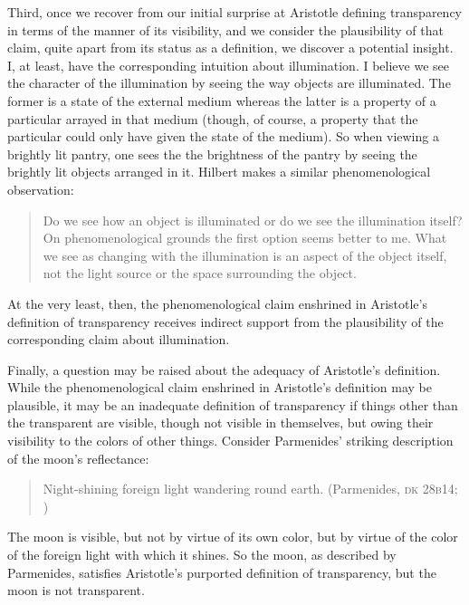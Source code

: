 Third, once we recover from our initial surprise at Aristotle defining transparency in terms of the manner of its visibility, and we consider the plausibility of that claim, quite apart from its status as a definition, we discover a potential insight. I, at least, have the corresponding intuition about illumination. I believe we see the character of the illumination by seeing the way objects are illuminated. The former is a state of the external medium whereas the latter is a property of a particular arrayed in that medium (though, of course, a property that the particular could only have given the state of the medium). So when viewing a brightly lit pantry, one sees the the brightness of the pantry by seeing the brightly lit objects arranged in it.  Hilbert makes a similar phenomenological observation:
\begin{quote}
	Do we see how an object is illuminated or do we see the illumination itself? On phenomenological grounds the first option seems better to me. What we see as changing with the illumination is an aspect of the object itself, not the light source or the space surrounding the object. \citep[150--151]{Hilbert:2007qy}
\end{quote}
At the very least, then, the phenomenological claim enshrined in Aristotle's definition of transparency receives indirect support from the plausibility of the corresponding claim about illumination.

Finally, a question may be raised about the adequacy of Aristotle's definition. While the phenomenological claim enshrined in Aristotle's definition may be plausible, it may be an inadequate definition of transparency if things other than the transparent are visible, though not visible in themselves, but owing their visibility to the colors of other things. Consider Parmenides' striking description of the moon's reflectance:
\begin{quote}
	Night-shining foreign light wandering round earth. (Parmenides, \textsc{dk} 28\textsc{b}14; \citealt[156]{McKirahan:1994ve})
\end{quote}
The moon is visible, but not by virtue of its own color, but by virtue of the color of the foreign light with which it shines. So the moon, as described by Parmenides, satisfies Aristotle's purported definition of transparency, but the moon is not transparent. 

